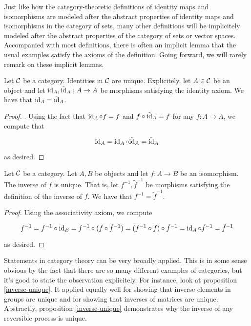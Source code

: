 \begin{rem} Just like how the category-theoretic definitions of identity maps and isomorphisms are modeled after the abstract properties of identity maps and isomorphisms in the category of sets, many other definitions will be implicitely modeled after the abstract properties of the category of sets or vector spaces. Accompanied with most definitions, there is often an implicit lemma that the usual examples satisfy the axioms of the definition. Going forward, we will rarely remark on these implicit lemmas.
\end{rem}

\begin{prop}\label{identity-unique} Let ${\mathcal C}$ be a category. Identities in ${\mathcal C}$ are unique. Explicitely, let $A\in {\mathcal C}$ be an object and let $\operatorname{id}_A,\tilde{\operatorname{id}}_A:A\to A$ be morphisms satisfying the identity axiom. We have that $\operatorname{id}_A=\tilde{\operatorname{id}}_A$.
\end{prop}
\begin{proof}. Using the fact that $\operatorname{id}_A \circ f = f$ and $f\circ \tilde{\operatorname{id}}_A=f$ for any $f:A\to A$, we compute that

$$\operatorname{id}_A= \operatorname{id}_A \circ \tilde{\operatorname{id}}_A = \tilde{\operatorname{id}}_A$$

as desired.
\end{proof}

\begin{prop}
\label{inverse-unique}
Let ${\mathcal C}$ be a category. Let $A,B$ be objects and let $f:A\to B$ be an isomorphism. The inverse of $f$ is unique. That is, let $f^{-1},\tilde{f}^{-1}$ be morphisms satisfying the definition of the inverse of $f$. We have that $f^{-1}=\tilde{f}^{-1}$.
\end{prop}
\begin{proof} Using the associativity axiom, we compute

$$f^{-1}=f^{-1}\circ \operatorname{id} _{B} = f^{-1}\circ (f \circ \tilde{f}^{-1})=(f^{-1}\circ f)\circ \tilde{f}^{-1}=\operatorname{id}_A \circ \tilde{f}^{-1}=\tilde{f}^{-1}$$

as desired.
\end{proof}

\begin{rem} Statements in category theory can be very broadly applied. This is in some sense obvious by the fact that there are so many different examples of categories, but it's good to state the observation explicitely. For instance, look at proposition \ref{inverse-unique}. It applied equally well for showing that inverse elements in groups are unique and for showing that inverses of matrices are unique. Abstractly, proposition \ref{inverse-unique} demonstrates why the inverse of any reversible process is unique.
\end{rem}

